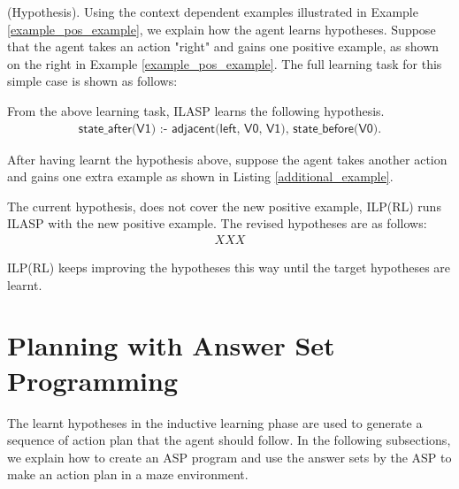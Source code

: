 \begin{examp} \normalfont (Hypothesis).
Using the context dependent examples illustrated in Example \ref{example_pos_example}, we explain how the agent learns hypotheses.
Suppose that the agent takes an action "right" and gains one positive example, as shown on the right in Example \ref{example_pos_example}. 
The full learning task for this simple case is shown as follows:


From the above learning task, ILASP learns the following hypothesis.
\begin{equation*}
\begin{split}
\textsf{state\_after(V1) :- adjacent(left, V0, V1), state\_before(V0).}
\end{split}
\end{equation*}

After having learnt the hypothesis above, suppose the agent takes another action and gains one extra example as shown in Listing \ref{additional_example}.


The current hypothesis, does not cover the new positive example, ILP(RL) runs ILASP with the new positive example. The revised hypotheses are as follows:
\begin{equation*}
\begin{split}
XXX
\end{split}
\end{equation*}

ILP(RL) keeps improving the hypotheses this way until the target hypotheses are learnt.
\end{examp}

\section{Planning with Answer Set Programming}
\label{sec:planning}
The learnt hypotheses in the inductive learning phase are used to generate a sequence of action plan that the agent should follow.
In the following subsections, we explain how to create an ASP program and use the answer sets by the ASP to make an action plan in a maze environment.
